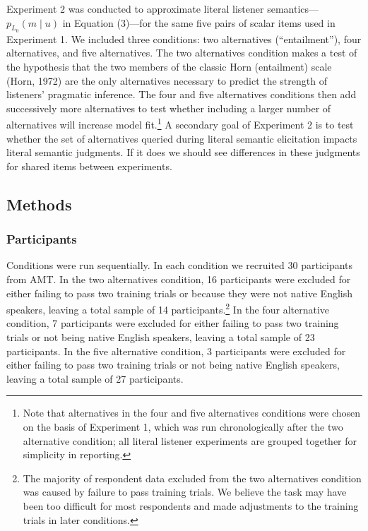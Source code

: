 \documentclass[10pt, letterpaper]{article}
\begin{document}
Experiment 2 was conducted to approximate literal listener
semantics---\(p_{L_0}(m \mid u)\) in Equation (3)---for the same five
pairs of scalar items used in Experiment 1. We included three
conditions: two alternatives (``entailment''), four alternatives, and
five alternatives. The two alternatives condition makes a test of the
hypothesis that the two members of the classic Horn (entailment) scale
(Horn, 1972) are the only alternatives necessary to predict the strength
of listeners' pragmatic inference. The four and five alternatives
conditions then add successively more alternatives to test whether
including a larger number of alternatives will increase model
fit.\footnote{Note that alternatives in the four and five alternatives conditions were chosen on the basis of Experiment 1, which was run chronologically after the two alternative condition; all literal listener experiments are grouped together for simplicity in reporting.}
A secondary goal of Experiment 2 is to test whether the set of
alternatives queried during literal semantic elicitation impacts literal
semantic judgments. If it does we should see differences in these
judgments for shared items between experiments.

\subsection{Methods}\label{methods-1}

\subsubsection{Participants}\label{participants-1}

Conditions were run sequentially. In each condition we recruited 30
participants from AMT. In the two alternatives condition, 16
participants were excluded for either failing to pass two training
trials or because they were not native English speakers, leaving a total
sample of 14
participants.\footnote{The majority of respondent data excluded from the two alternatives condition was caused by failure to pass training trials. We believe the task may have been too difficult for most respondents and made adjustments to the training trials in later conditions.}
In the four alternative condition, 7 participants were excluded for
either failing to pass two training trials or not being native English
speakers, leaving a total sample of 23 participants. In the five
alternative condition, 3 participants were excluded for either failing
to pass two training trials or not being native English speakers,
leaving a total sample of 27 participants.
\end{document}
